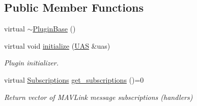 \subsection*{Public Member Functions}
\begin{DoxyCompactItemize}
\item 
virtual \mbox{\hyperlink{group__plugin_gad79dda3665b106d020b938fab5a6a5a5}{$\sim$\+Plugin\+Base}} ()
\item 
virtual void \mbox{\hyperlink{group__plugin_gad5313a41da4d26acbbabf008cdc21e82}{initialize}} (\mbox{\hyperlink{classmavros_1_1UAS}{U\+AS}} \&uas)
\begin{DoxyCompactList}\small\item\em Plugin initializer. \end{DoxyCompactList}\item 
virtual \mbox{\hyperlink{group__plugin_ga8967d61fc77040e0c3ea5a4585d62a09}{Subscriptions}} \mbox{\hyperlink{group__plugin_gaf4e23fec6d7436a62cbf0942a2e5791c}{get\+\_\+subscriptions}} ()=0
\begin{DoxyCompactList}\small\item\em Return vector of M\+A\+V\+Link message subscriptions (handlers) \end{DoxyCompactList}\end{DoxyCompactItemize}
